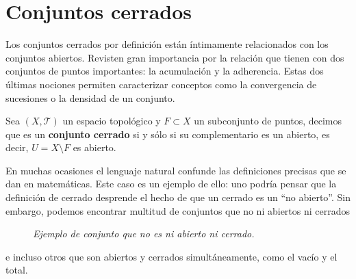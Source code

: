 \section{Conjuntos cerrados}%
\label{sec:conjuntos_cerrados}
Los conjuntos cerrados por definición están íntimamente relacionados con los conjuntos abiertos. Revisten gran importancia por la relación que tienen con dos conjuntos de puntos importantes: la acumulación y la adherencia. Estas dos últimas nociones permiten caracterizar conceptos como la convergencia de sucesiones o la densidad de un conjunto.

\begin{defi}
Sea $\left( X, \mathcal{T} \right)$ un espacio topológico y $F\subset X$ un subconjunto de puntos, decimos que es un \textbf{conjunto cerrado} si y sólo si su complementario es un abierto, es decir, $U = X \setminus F$ es abierto.
\end{defi}

\begin{obs}
En muchas ocasiones el lenguaje natural confunde las definiciones precisas que se dan en matemáticas. Este caso es un ejemplo de ello: uno podría pensar que la definición de cerrado desprende el hecho de que un cerrado es un ``no abierto''. Sin embargo, podemos encontrar multitud de conjuntos que no ni abiertos ni cerrados
\begin{figure}[H]
    \centering
    \caption{\textit{Ejemplo de conjunto que no es ni abierto ni cerrado.}}
    \label{fig:observación-abiertos-y-cerrados.}
\end{figure}
e incluso otros que son abiertos y cerrados simultáneamente, como el vacío y el total.
\end{obs}

